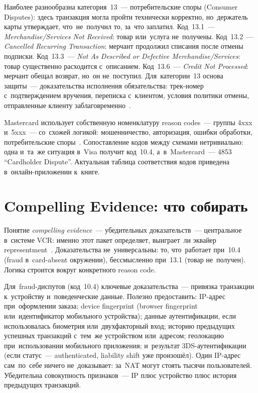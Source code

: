 Наиболее разнообразна категория~13~--- потребительские споры (Consumer Disputes): здесь транзакция могла пройти технически
корректно, но~держатель карты утверждает, что~не~получил то, за~что
заплатил. Код~13.1~--- \textit{Merchandise/Services Not Received}: товар
или~услуга не~получены. Код~13.2~--- \textit{Cancelled Recurring Transaction}:
мерчант продолжил списания после отмены подписки. Код~13.3~---
\textit{Not As Described or Defective Merchandise/Services}: товар существенно
расходится с~описанием. Код~13.6~--- \textit{Credit Not Processed}: мерчант
обещал возврат, но~он не~поступил. Для~категории~13 основа защиты~---
доказательства исполнения обязательства: трек-номер с~подтверждением вручения,
переписка с~клиентом, условия политики отмены, отправленные клиенту
заблаговременно~.

Mastercard использует собственную номенклатуру reason codes~--- группы
4xxx и~5xxx~--- со~схожей логикой: мошенничество, авторизация, ошибки
обработки, потребительские споры~. Сопоставление
кодов между схемами нетривиально: одна и~та~же ситуация в~Visa получит
код~10.4, а~в~Mastercard~--- 4853 \enquote{Cardholder Dispute}. Актуальная
таблица соответствия кодов приведена в~онлайн-приложении к~книге.


\section{Compelling Evidence: что собирать}
\label{sec:disputes-evidence}

Понятие \textit{compelling evidence}~--- убедительных доказательств~---
центральное в~системе VCR: именно этот пакет определяет, выиграет~ли
эквайер representment~. Доказательства
не~универсальны: то, что~работает при~10.4 (fraud в~card-absent
окружении), бессмысленно при~13.1 (товар не~получен). Логика строится
вокруг конкретного reason code.

Для~fraud-диспутов (код~10.4) ключевые доказательства~--- привязка
транзакции к~устройству и~поведенческие данные. Полезно предоставить:
IP-адрес при~оформлении заказа; device fingerprint (browser fingerprint
или~идентификатор мобильного устройства); данные аутентификации, если
использовалась биометрия или~двухфакторный вход; историю предыдущих
успешных транзакций с~тем~же устройством или~адресом; геолокацию при~использовании
мобильного приложения; и~результат 3DS-аутентификации (если статус~---
authenticated, liability shift уже произошёл). Один IP-адрес сам~по~себе
ничего не~доказывает: за~NAT могут стоять тысячи пользователей. Убедительна
совокупность признаков~--- IP плюс устройство плюс история предыдущих
транзакций.

